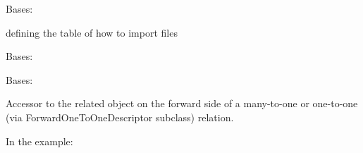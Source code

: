 \documentclass[letterpaper,10pt,english]{sphinxmanual}
\begin{document}
\begin{fulllineitems}
\label{\detokenize{QuChemPedIA.models:QuChemPedIA.models.ImportRuleModel.ImportRule}}
Bases: 

defining the table of how to import files

\begin{fulllineitems}
\label{\detokenize{QuChemPedIA.models:QuChemPedIA.models.ImportRuleModel.ImportRule.DoesNotExist}}
Bases: 

\end{fulllineitems}


\begin{fulllineitems}
\label{\detokenize{QuChemPedIA.models:QuChemPedIA.models.ImportRuleModel.ImportRule.MultipleObjectsReturned}}
Bases: 

\end{fulllineitems}


\begin{fulllineitems}
\label{\detokenize{QuChemPedIA.models:QuChemPedIA.models.ImportRuleModel.ImportRule.id_job_type}}
Accessor to the related object on the forward side of a many-to-one or
one-to-one (via ForwardOneToOneDescriptor subclass) relation.

In the example:

%
\begin{sphinxVerbatim}[commandchars=\\\{\}]
 
       
\end{sphinxVerbatim}


\end{fulllineitems}
\end{fulllineitems}
\end{document}
